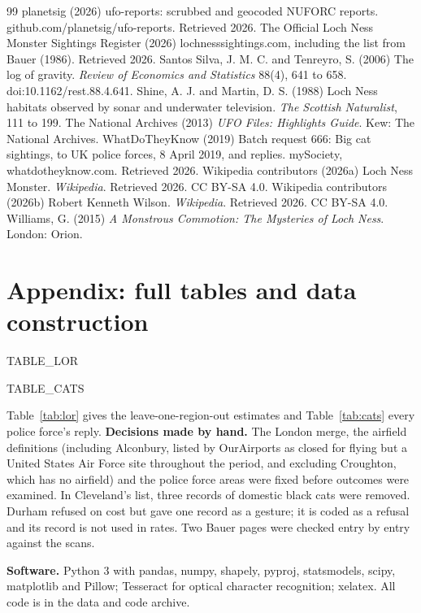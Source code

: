 \documentclass[11pt,a4paper]{article}
\begin{document}
\begin{thebibliography}{99}
 planetsig (2026) ufo-reports: scrubbed and geocoded NUFORC reports. github.com/planetsig/ufo-reports. Retrieved 2026.
 The Official Loch Ness Monster Sightings Register (2026) lochnesssightings.com, including the list from Bauer (1986). Retrieved 2026.
 Santos Silva, J. M. C. and Tenreyro, S. (2006) The log of gravity. \textit{Review of Economics and Statistics} 88(4), 641 to 658. doi:10.1162/rest.88.4.641.
 Shine, A. J. and Martin, D. S. (1988) Loch Ness habitats observed by sonar and underwater television. \textit{The Scottish Naturalist}, 111 to 199.
 The National Archives (2013) \textit{UFO Files: Highlights Guide}. Kew: The National Archives.
 WhatDoTheyKnow (2019) Batch request 666: Big cat sightings, to UK police forces, 8 April 2019, and replies. mySociety, whatdotheyknow.com. Retrieved 2026.
 Wikipedia contributors (2026a) Loch Ness Monster. \textit{Wikipedia}. Retrieved 2026. CC BY-SA 4.0.
 Wikipedia contributors (2026b) Robert Kenneth Wilson. \textit{Wikipedia}. Retrieved 2026. CC BY-SA 4.0.
 Williams, G. (2015) \textit{A Monstrous Commotion: The Mysteries of Loch Ness}. London: Orion.
\end{thebibliography}

\appendix
\section{Appendix: full tables and data construction}
{{TABLE_LOR}}

{{TABLE_CATS}}

Table~\ref{tab:lor} gives the leave-one-region-out estimates and Table~\ref{tab:cats} every police force's reply. \textbf{Decisions made by hand.} The London merge, the airfield definitions (including Alconbury, listed by OurAirports as closed for flying but a United States Air Force site throughout the period, and excluding Croughton, which has no airfield) and the police force areas were fixed before outcomes were examined. In Cleveland's list, three records of domestic black cats were removed. Durham refused on cost but gave one record as a gesture; it is coded as a refusal and its record is not used in rates. Two Bauer pages were checked entry by entry against the scans.

\textbf{Software.} Python 3 with pandas, numpy, shapely, pyproj, statsmodels, scipy, matplotlib and Pillow; Tesseract for optical character recognition; xelatex. All code is in the data and code archive.
\end{document}
